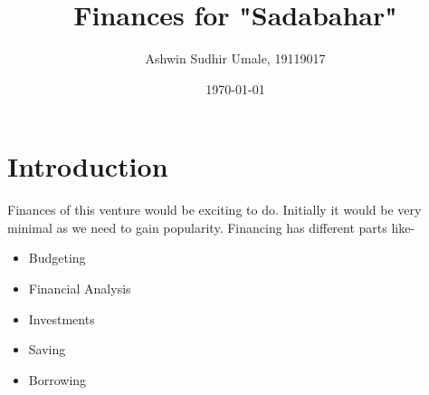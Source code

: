 \documentclass{article}
\title{Finances for "Sadabahar"}
\author{Ashwin Sudhir Umale, 19119017}
\date{\today}
\begin{document}
\maketitle


\section{Introduction}

Finances of this venture would be exciting to do. Initially it would be very minimal as we need to gain popularity. Financing has different parts like-
\begin{itemize}
    \item Budgeting
    \item Financial Analysis
    \item Investments
    \item Saving 
    \item Borrowing
\end{itemize}
\end{document}
